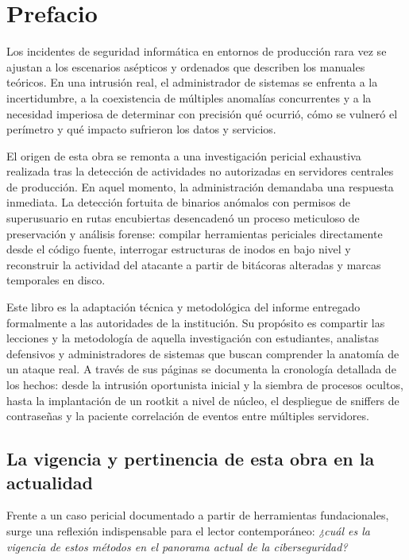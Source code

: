 \chapter*{Prefacio}

Los incidentes de seguridad informática en entornos de producción rara vez se ajustan a los escenarios asépticos y ordenados que describen los manuales teóricos. En una intrusión real, el administrador de sistemas se enfrenta a la incertidumbre, a la coexistencia de múltiples anomalías concurrentes y a la necesidad imperiosa de determinar con precisión qué ocurrió, cómo se vulneró el perímetro y qué impacto sufrieron los datos y servicios.

El origen de esta obra se remonta a una investigación pericial exhaustiva realizada tras la detección de actividades no autorizadas en servidores centrales de producción. En aquel momento, la administración demandaba una respuesta inmediata. La detección fortuita de binarios anómalos con permisos de superusuario en rutas encubiertas desencadenó un proceso meticuloso de preservación y análisis forense: compilar herramientas periciales directamente desde el código fuente, interrogar estructuras de inodos en bajo nivel y reconstruir la actividad del atacante a partir de bitácoras alteradas y marcas temporales en disco.

Este libro es la adaptación técnica y metodológica del informe entregado formalmente a las autoridades de la institución. Su propósito es compartir las lecciones y la metodología de aquella investigación con estudiantes, analistas defensivos y administradores de sistemas que buscan comprender la anatomía de un ataque real. A través de sus páginas se documenta la cronología detallada de los hechos: desde la intrusión oportunista inicial y la siembra de procesos ocultos, hasta la implantación de un rootkit a nivel de núcleo, el despliegue de sniffers de contraseñas y la paciente correlación de eventos entre múltiples servidores.

\section*{La vigencia y pertinencia de esta obra en la actualidad}

Frente a un caso pericial documentado a partir de herramientas fundacionales, surge una reflexión indispensable para el lector contemporáneo: \textit{¿cuál es la vigencia de estos métodos en el panorama actual de la ciberseguridad?}

